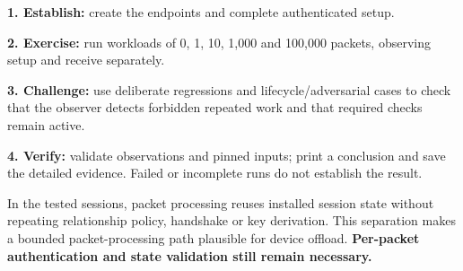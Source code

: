 \documentclass[10pt,a4paper]{article}
\newcommand{\sectionlabel}[1]{\par\vspace{4pt}{\large\bfseries #1}\par}
\begin{document}
\sectionlabel{Procedure and controls}
\textbf{1. Establish:} create the endpoints and complete authenticated setup.\par
\textbf{2. Exercise:} run workloads of 0, 1, 10, 1,000 and 100,000 packets, observing setup and receive separately.\par
\textbf{3. Challenge:} use deliberate regressions and lifecycle/adversarial cases to check that the observer detects forbidden repeated work and that required checks remain active.\par
\textbf{4. Verify:} validate observations and pinned inputs; print a conclusion and save the detailed evidence. Failed or incomplete runs do not establish the result.
\sectionlabel{Conclusion supported by the experiment}
In the tested sessions, packet processing reuses installed session state without repeating relationship policy, handshake or key derivation. This separation makes a bounded packet-processing path plausible for device offload. \textbf{Per-packet authentication and state validation still remain necessary.}
\end{document}
